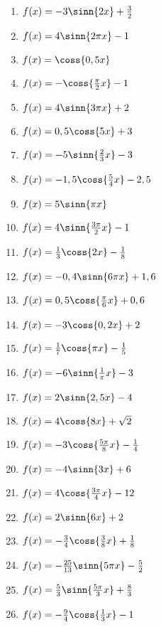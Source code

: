 \begin{Exercise}[title={\raggedright\normalfont Bestimme jeweils alle Hoch-, Tief- und Wendepunkte:}, label=sincosExtremWendeA1]
	\begin{enumerate}[label=\alph*)]
		\item \(f(x)=-3\sinn{2x}+\frac{3}{2}\)
		\item \(f(x)=4\sinn{2\pi x}-1\)
		\item \(f(x)=\coss{0,5x}\)
		\item \(f(x)=-\coss{\frac{\pi}{2}x}-1\)
		\item \(f(x)=4\sinn{3\pi x}+2\)
		\item \(f(x)=0,5\coss{5x}+3\)
		\item \(f(x)=-5\sinn{\frac{2}{3}x}-3\)
		\item \(f(x)=-1,5\coss{\frac{5}{4}x}-2,5\)
		\item \(f(x)=5\sinn{\pi x}\)
		\item \(f(x)=4\sinn{\frac{3\pi}{2}x}-1\)
		\item \(f(x)=\frac{1}{3}\coss{2x}-\frac{1}{8}\)
		\item \(f(x)=-0,4\sinn{6\pi x}+1,6\)
		\item \(f(x)=0,5\coss{\frac{\pi}{6}x}+0,6\)
		\item \(f(x)=-3\coss{0,2x}+2\)
		\item \(f(x)=\frac{1}{7}\coss{\pi x}-\frac{1}{5}\)
		\item \(f(x)=-6\sinn{\frac{1}{\pi}x}-3\)
		\item \(f(x)=2\sinn{2,5x}-4\)
		\item \(f(x)=4\coss{8x}+\sqrt{2}\)
		\item \(f(x)=-3\coss{\frac{5\pi}{8}x}-\frac{1}{4}\)
		\item \(f(x)=-4\sinn{3x}+6\)
		\item \(f(x)=4\coss{\frac{3\pi}{4}x}-12\)
		\item \(f(x)=2\sinn{6x}+2\)
		\item \(f(x)=-\frac{3}{4}\coss{\frac{3}{8}x}+\frac{1}{8}\)
		\item \(f(x)=-\frac{25}{13}\sinn{5\pi x}-\frac{5}{2}\)
		\item \(f(x)=\frac{5}{3}\sinn{\frac{5\pi}{3}x}+\frac{8}{3}\)
		\item \(f(x)=-\frac{9}{4}\coss{\frac{1}{3}x}-1\)
	\end{enumerate}
\end{Exercise}

